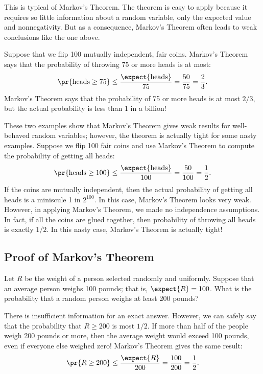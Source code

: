 This is typical of Markov's Theorem.  The theorem is easy to apply
because it requires so little information about a random variable,
only the expected value and nonnegativity.  But as a consequence,
Markov's Theorem often leads to weak conclusions like the one above.

Suppose that we flip 100 mutually independent, fair coins.  Markov's
Theorem says that the probability of throwing 75 or more heads is at
most:
\[
\pr{\text{heads} \geq 75} \leq \frac{\expect{\text{heads}}}{75} =
\frac{50}{75} = \frac{2}{3}.
\]
Markov's Theorem says that the probability of 75 or more heads is at
most $2/3$, but the actual probability is less than 1 in a
billion!

These two examples show that Markov's Theorem gives weak results for
well-behaved random variables; however, the theorem is actually tight
for some nasty examples.  Suppose we flip 100 fair coins and use
Markov's Theorem to compute the probability of getting all heads:
\[
\pr{\text{heads} \geq 100} \leq \frac{\expect{\text{heads}}}{100} =
\frac{50}{100} = \frac{1}{2}.
\]
If the coins are mutually independent, then the actual probability of
getting all heads is a miniscule 1 in $2^{100}$.  In this case, Markov's
Theorem looks very weak.  However, in applying Markov's Theorem, we made
no independence assumptions.  In fact, if all the coins are glued
together, then probability of throwing all heads is exactly $1/2$.
In this nasty case, Markov's Theorem is actually tight!

\subsection{Proof of Markov's Theorem}

Let $R$ be the weight of a person selected randomly and uniformly.
Suppose that an average person weighs 100 pounds; that is, $\expect{R} =
100$.  What is the probability that a random person weighs at least
200 pounds?

There is insufficient information for an exact answer.  However, we
can safely say that the probability that $R \geq 200$ is most
$1/2$.  If more than half of the people weigh 200 pounds or
more, then the average weight would exceed 100 pounds, even if
everyone else weighed zero!  Markov's Theorem gives the same result:
\begin{displaymath}
  \pr{R \geq 200} \leq \frac{\expect{R}}{200} = \frac{100}{200} = \frac{1}{2}.
\end{displaymath}

